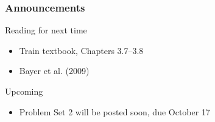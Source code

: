 \documentclass{beamer}\usepackage[]{graphicx}\usepackage[]{color}
\begin{document}
\begin{frame}\frametitle{Announcements}
    Reading for next time
    \begin{itemize}
        \item Train textbook, Chapters 3.7--3.8
        \item Bayer et al. (2009)
    \end{itemize}
    \vspace{3ex}
    Upcoming
    \begin{itemize}
        \item Problem Set 2 will be posted soon, due October 17
    \end{itemize}
\end{frame}
\end{document}
